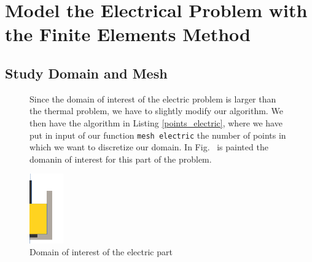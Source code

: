 \section{Model the Electrical Problem with the Finite Elements Method}
\subsection{Study Domain and Mesh}

\begin{figure}[htbp]
	\begin{minipage}[c]{.5\linewidth}
		Since the domain of interest of the electric problem is larger than the thermal problem, we have to slightly modify our algorithm. We then have the algorithm in Listing \ref{points_electric}, where we have put in input of our function \texttt{mesh electric} the number of points in which we want to discretize our domain. In Fig.~ is painted the domanin of interest for this part of the problem.   
	\end{minipage} \hfill
	\begin{minipage}[c]{.5\linewidth}
		\centering
		\includegraphics[height=3cm]{Images/electric_domain.png}
		\caption{Domain of interest of the electric part}
		\label{figure:electric_domain}
	\end{minipage}
\end{figure}






